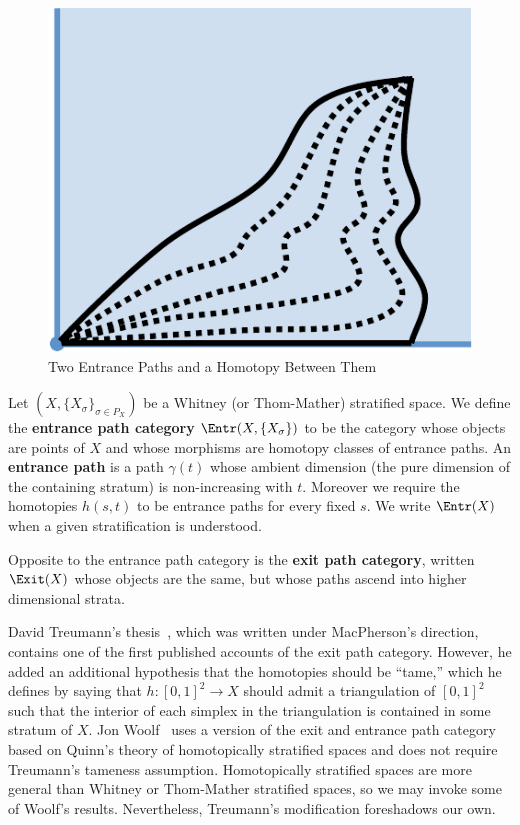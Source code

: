 \begin{figure}
	\centering
	\includegraphics[width=.5\textwidth]{entr_path.pdf}
	\caption{Two Entrance Paths and a Homotopy Between Them}
	\label{fig:entr_path}
\end{figure}

\begin{defn}
	Let $(X,\{X_{\sigma}\}_{\sigma\in P_X})$ be a Whitney (or Thom-Mather) stratified space. We define the \textbf{entrance path category} $\Entr(X,\{X_{\sigma}\})$ to be the category whose objects are points of $X$ and whose morphisms are homotopy classes of entrance paths. An \textbf{entrance path} is a path $\gamma(t)$ whose ambient dimension (the pure dimension of the containing stratum) is non-increasing with $t$. Moreover we require the homotopies $h(s,t)$ to be entrance paths for every fixed $s$. We write $\Entr(X)$ when a given stratification is understood.
	
	Opposite to the entrance path category is the \textbf{exit path category}, written $\Exit(X)$ whose objects are the same, but whose paths ascend into higher dimensional strata.
\end{defn}
\begin{rmk}
	David Treumann's thesis~\cite{treumann-stacks}, which was written under MacPherson's direction, contains one of the first published accounts of the exit path category. However, he added an additional hypothesis that the homotopies should be ``tame,'' which he defines by saying that $h:[0,1]^2\to X$ should admit a triangulation of $[0,1]^2$ such that the interior of each simplex in the triangulation is contained in some stratum of $X$. Jon Woolf~\cite{woolf} uses a version of the exit and entrance path category based on Quinn's theory of homotopically stratified spaces and does not require Treumann's tameness assumption. Homotopically stratified spaces are more general than Whitney or Thom-Mather stratified spaces, so we may invoke some of Woolf's results. Nevertheless, Treumann's modification foreshadows our own.
\end{rmk}

